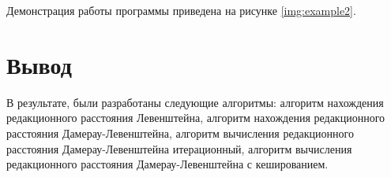 Демонстрация работы программы приведена на рисунке \ref{img:example2}.


\pagebreak

\section*{Вывод}

В результате, были разработаны следующие алгоритмы: алгоритм нахождения редакционного расстояния Левенштейна, алгоритм нахождения редакционного расстояния Дамерау-Левенштейна, алгоритм вычисления редакционного расстояния Дамерау-Левенштейна итерационный, алгоритм вычисления редакционного расстояния Дамерау-Левенштейна с кешированием.
